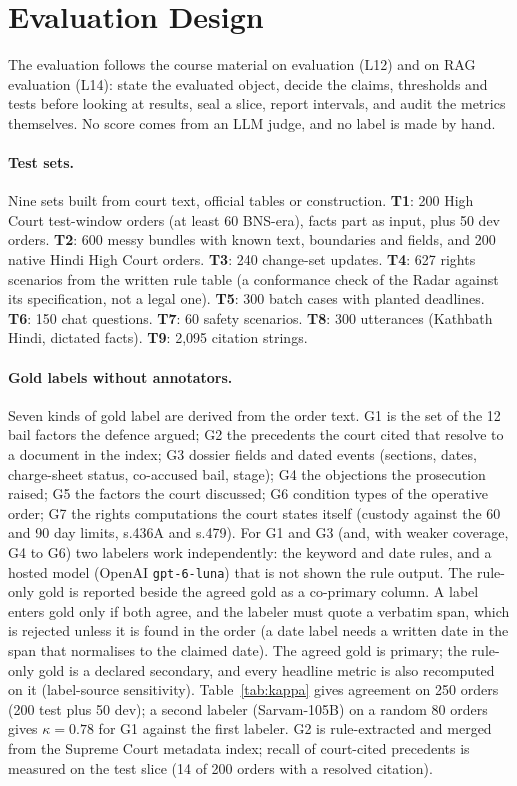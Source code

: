 \section{Evaluation Design}
\label{sec:eval}

The evaluation follows the course material on evaluation (L12) and on RAG evaluation (L14): state the evaluated object, decide the claims, thresholds and tests before looking at results, seal a slice, report intervals, and audit the metrics themselves. No score comes from an LLM judge, and no label is made by hand.

\paragraph{Test sets.} Nine sets built from court text, official tables or construction. \textbf{T1}: 200 High Court test-window orders (at least 60 BNS-era), facts part as input, plus 50 dev orders. \textbf{T2}: 600 messy bundles with known text, boundaries and fields, and 200 native Hindi High Court orders. \textbf{T3}: 240 change-set updates. \textbf{T4}: 627 rights scenarios from the written rule table (a conformance check of the Radar against its specification, not a legal one). \textbf{T5}: 300 batch cases with planted deadlines. \textbf{T6}: 150 chat questions. \textbf{T7}: 60 safety scenarios. \textbf{T8}: 300 utterances (Kathbath Hindi, dictated facts). \textbf{T9}: 2,095 citation strings.

\paragraph{Gold labels without annotators.} Seven kinds of gold label are derived from the order text. G1 is the set of the 12 bail factors the defence argued; G2 the precedents the court cited that resolve to a document in the index; G3 dossier fields and dated events (sections, dates, charge-sheet status, co-accused bail, stage); G4 the objections the prosecution raised; G5 the factors the court discussed; G6 condition types of the operative order; G7 the rights computations the court states itself (custody against the 60 and 90 day limits, s.436A and s.479). For G1 and G3 (and, with weaker coverage, G4 to G6) two labelers work independently: the keyword and date rules, and a hosted model (OpenAI \texttt{gpt-6-luna}) that is not shown the rule output. The rule-only gold is reported beside the agreed gold as a co-primary column. A label enters gold only if both agree, and the labeler must quote a verbatim span, which is rejected unless it is found in the order (a date label needs a written date in the span that normalises to the claimed date). The agreed gold is primary; the rule-only gold is a declared secondary, and every headline metric is also recomputed on it (label-source sensitivity). Table~\ref{tab:kappa} gives agreement on 250 orders (200 test plus 50 dev); a second labeler (Sarvam-105B) on a random 80 orders gives $\kappa = 0.78$ for G1 against the first labeler. G2 is rule-extracted and merged from the Supreme Court metadata index; recall of court-cited precedents is measured on the test slice (14 of 200 orders with a resolved citation).

